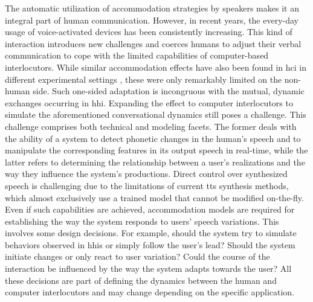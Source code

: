 The automatic utilization of accommodation strategies by speakers makes it an integral part of human communication.
However, in recent years, the every-day usage of voice-activated devices has been consistently increasing.
This kind of interaction introduces new challenges and coerces humans to adjust their verbal communication to cope with the limited capabilities of computer-based interlocutors.
While similar accommodation effects have also been found in \acl{hci} in different experimental settings \citep[e.g.,][]{Bell2003prosodic, Levitan2013entrainment, Parent2010lexical}, these were only remarkably limited on the non-human side.
Such one-sided adaptation is incongruous with the mutual, dynamic exchanges occurring in \acl{hhi}.
Expanding the effect to computer interlocutors to simulate the aforementioned conversational dynamics still poses a challenge.
This challenge comprises both technical and modeling facets.
The former deals with the ability of a system to detect phonetic changes in the human's speech and to manipulate the corresponding features in its output speech in real-time, while the latter refers to determining the relationship between a user's realizations and the way they influence the system's productions.
Direct control over synthesized speech is challenging due to the limitations of current \acl{tts} synthesis methods, which almost exclusively use a trained model that cannot be modified on-the-fly.
Even if such capabilities are achieved, accommodation models are required for establishing the way the system responds to users' speech variations.
This involves some design decisions.
For example, should the system try to simulate behaviors observed in \aclp{hhi} or simply follow the user's lead?
Should the system initiate changes or only react to user variation?
Could the course of the interaction be influenced by the way the system adapts towards the user?
All these decisions are part of defining the dynamics between the human and computer interlocutors and may change depending on the specific application.

